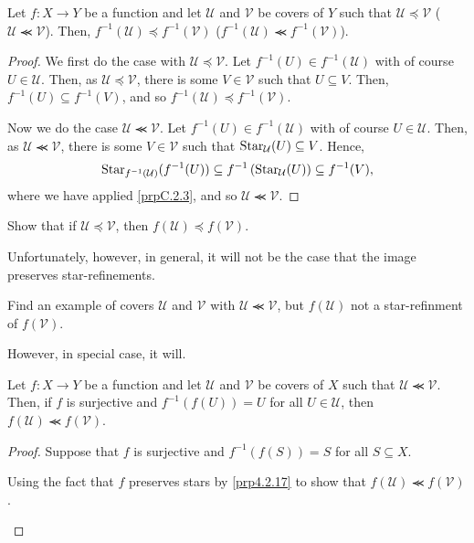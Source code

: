 \begin{prp}\label{prpB.2.12}
Let $f:X\rightarrow Y$ be a function and let $\mathcal{U}$ and $\mathcal{V}$ be covers of $Y$ such that $\mathcal{U}\preceq \mathcal{V}$ ($\mathcal{U}\llcurly \mathcal{V}$).  Then, $f^{-1}(\mathcal{U})\preceq f^{-1}(\mathcal{V})$ ($f^{-1}(\mathcal{U})\llcurly f^{-1}(\mathcal{V})$).
\begin{proof}
We first do the case with $\mathcal{U}\preceq \mathcal{V}$.  Let $f^{-1}(U)\in f^{-1}(\mathcal{U})$ with of course $U\in \mathcal{U}$.  Then, as $\mathcal{U}\preceq \mathcal{V}$, there is some $V\in \mathcal{V}$ such that $U\subseteq V$.  Then, $f^{-1}(U)\subseteq f^{-1}(V)$, and so $f^{-1}(\mathcal{U})\preceq f^{-1}(\mathcal{V})$.

Now we do the case $\mathcal{U}\llcurly \mathcal{V}$.  Let $f^{-1}(U)\in f^{-1}(\mathcal{U})$ with of course $U\in \mathcal{U}$.  Then, as $\mathcal{U}\llcurly \mathcal{V}$, there is some $V\in \mathcal{V}$ such that $\operatorname{Star} _{\mathcal{U}}(U)\subseteq V$.  Hence,
\begin{equation}
\operatorname{Star} _{f^{-1}(\mathcal{U})}(f^{-1}(U))\subseteq f^{-1}\left( \operatorname{Star} _{\mathcal{U}}(U)\right) \subseteq f^{-1}(V),
\end{equation}
where we have applied \cref{prpC.2.3}, and so $\mathcal{U}\llcurly \mathcal{V}$.
\end{proof}
\end{prp}
\begin{exr}
Show that if $\mathcal{U}\preceq \mathcal{V}$, then $f(\mathcal{U})\preceq f(\mathcal{V})$.
\end{exr}
Unfortunately, however, in general, it will not be the case that the image preserves star-refinements.
\begin{exr}
Find an example of covers $\mathcal{U}$ and $\mathcal{V}$ with $\mathcal{U}\llcurly \mathcal{V}$, but $f(\mathcal{U})$ not a star-refinment of $f(\mathcal{V})$.
\end{exr}
However, in special case, it will.
\begin{prp}\label{prp4.2.17x}
Let $f:X\rightarrow Y$ be a function and let $\mathcal{U}$ and $\mathcal{V}$ be covers of $X$ such that $\mathcal{U}\llcurly \mathcal{V}$.  Then, if $f$ is surjective and $f^{-1}(f(U))=U$ for all $U\in \mathcal{U}$, then $f(\mathcal{U})\llcurly f(\mathcal{V})$.
\begin{proof}
Suppose that $f$ is surjective and $f^{-1}(f(S))=S$ for all $S\subseteq X$.
\begin{exr}
Using the fact that $f$ preserves stars by \cref{prp4.2.17} to show that $f(\mathcal{U})\llcurly f(\mathcal{V})$.
\end{exr}
\end{proof}
\end{prp}

